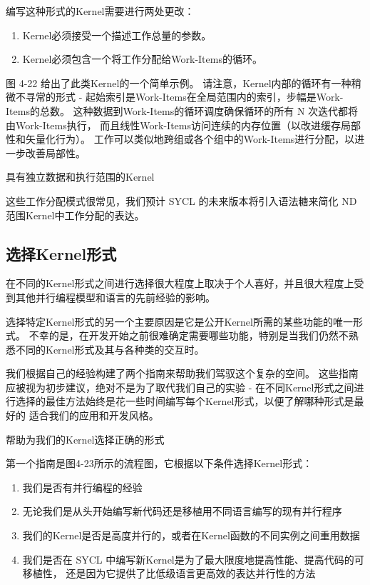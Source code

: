 编写这种形式的Kernel需要进行两处更改：

\begin{enumerate}
	\item Kernel必须接受一个描述工作总量的参数。

	\item Kernel必须包含一个将工作分配给Work-Items的循环。
\end{enumerate}

图 4-22 给出了此类Kernel的一个简单示例。 请注意，Kernel内部的循环有一种稍微不寻常的形式 - 
起始索引是Work-Items在全局范围内的索引，步幅是Work-Items的总数。 
这种数据到Work-Items的循环调度确保循环的所有 N 次迭代都将由Work-Items执行，
而且线性Work-Items访问连续的内存位置（以改进缓存局部性和矢量化行为）。 
工作可以类似地跨组或各个组中的Work-Items进行分配，以进一步改善局部性。

{\color{red} 具有独立数据和执行范围的Kernel}

这些工作分配模式很常见，我们预计 SYCL 的未来版本将引入语法糖来简化 ND 范围Kernel中工作分配的表达。

\subsection{选择Kernel形式}
在不同的Kernel形式之间进行选择很大程度上取决于个人喜好，并且很大程度上受到其他并行编程模型和语言的先前经验的影响。

选择特定Kernel形式的另一个主要原因是它是公开Kernel所需的某些功能的唯一形式。 
不幸的是，在开发开始之前很难确定需要哪些功能，特别是当我们仍然不熟悉不同的Kernel形式及其与各种类的交互时。

我们根据自己的经验构建了两个指南来帮助我们驾驭这个复杂的空间。 
这些指南应被视为初步建议，绝对不是为了取代我们自己的实验 - 
在不同Kernel形式之间进行选择的最佳方法始终是花一些时间编写每个Kernel形式，以便了解哪种形式是最好的 适合我们的应用和开发风格。

{\color{red} 帮助为我们的Kernel选择正确的形式}

第一个指南是图4-23所示的流程图，它根据以下条件选择Kernel形式：

\begin{enumerate}
	\item 我们是否有并行编程的经验

	\item 无论我们是从头开始编写新代码还是移植用不同语言编写的现有并行程序

	\item 我们的Kernel是否是高度并行的，或者在Kernel函数的不同实例之间重用数据

	\item 我们是否在 SYCL 中编写新Kernel是为了最大限度地提高性能、提高代码的可移植性，
	还是因为它提供了比低级语言更高效的表达并行性的方法
\end{enumerate}


